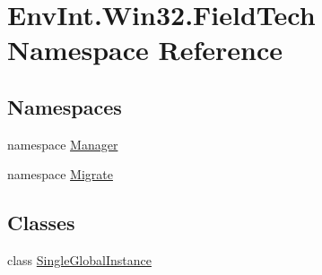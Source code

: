 \hypertarget{namespace_env_int_1_1_win32_1_1_field_tech}{}\section{Env\+Int.\+Win32.\+Field\+Tech Namespace Reference}
\label{namespace_env_int_1_1_win32_1_1_field_tech}
\subsection*{Namespaces}
\begin{DoxyCompactItemize}
\item 
namespace \hyperlink{namespace_env_int_1_1_win32_1_1_field_tech_1_1_manager}{Manager}
\item 
namespace \hyperlink{namespace_env_int_1_1_win32_1_1_field_tech_1_1_migrate}{Migrate}
\end{DoxyCompactItemize}
\subsection*{Classes}
\begin{DoxyCompactItemize}
\item 
class \hyperlink{class_env_int_1_1_win32_1_1_field_tech_1_1_single_global_instance}{Single\+Global\+Instance}
\end{DoxyCompactItemize}
